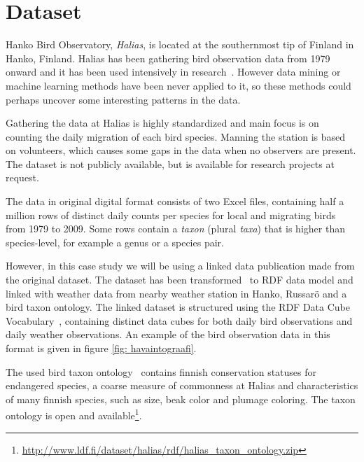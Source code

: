 \documentclass[english]{tktltiki2}
\begin{document}
\section{Dataset}

Hanko Bird Observatory, \emph{Halias}, is located at the southernmost tip of Finland in Hanko, Finland. Halias has been gathering bird observation data from 1979 onward and it has been used intensively in research~\cite{HangonJulkaisut}. However data mining or machine learning methods have been never applied to it, so these methods could perhaps uncover some interesting patterns in the data.

Gathering the data at Halias is highly standardized and main focus is on counting the daily migration of each bird species. Manning the station is based on volunteers, which causes some gaps in the data when no observers are present.
The dataset is not publicly available, but is available for research projects at request.

The data in original digital format consists of two Excel files, containing half a million rows of distinct daily counts per species for local and migrating birds from 1979 to 2009. Some rows contain a \emph{taxon} (plural \emph{taxa}) that is higher than species-level, for example a genus or a species pair.

However, in this case study we will be using a linked data publication made from the original dataset. The dataset has been transformed~\cite{koho-hyvonen-orni-2014, koho2015gradu} to RDF data model and linked with weather data from nearby weather station in Hanko, Russarö and a bird taxon ontology.
The linked dataset is structured using the RDF Data Cube Vocabulary~\cite{w3crdfdatacube}, containing distinct data cubes for both daily bird observations and daily weather observations. An example of the bird observation data in this format is given in figure \ref{fig: havaintograafi}.

The used bird taxon ontology~\cite{koho2015gradu} contains finnish conservation statuses for endangered species, a coarse measure of commonness at Halias and characteristics of many finnish species, such as size, beak color and plumage coloring. The taxon ontology is open and available\footnote{\url{http://www.ldf.fi/dataset/halias/rdf/halias_taxon_ontology.zip}}.
\end{document}
